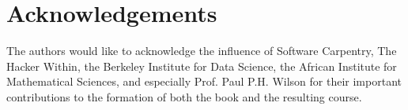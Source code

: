 \documentclass{anstrans}
\begin{document}
\section{Acknowledgements} 

The authors would like to acknowledge the influence of Software Carpentry, The 
Hacker Within, the Berkeley Institute for Data Science, the African Institute 
for Mathematical Sciences, and especially Prof. Paul P.H. Wilson for their important 
contributions to the formation of both the book and the resulting course.


 
\end{document}
